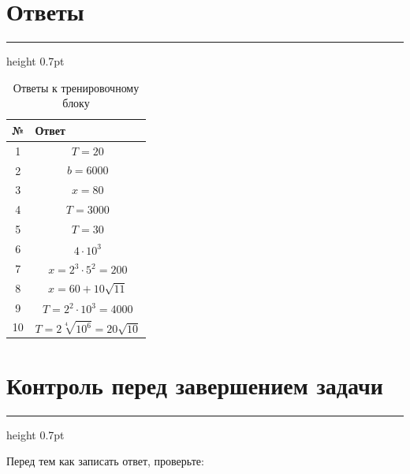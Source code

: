 \documentclass[a4paper,12pt]{article}
\newcommand{\sectionline}{%
    \par\vspace{0.15em}
    {\color{lightaccent}\hrule height 0.7pt}
    \vspace{0.7em}
}
\begin{document}

\newpage
\thispagestyle{fancy}

\section*{\textcolor{darkaccent}{Ответы}}

\sectionline

\renewcommand{\arraystretch}{1.4}

\begin{table}[ht]
\centering
\caption{Ответы к тренировочному блоку}
\begin{tabularx}{\linewidth}{@{}cX@{}}
\toprule
\textbf{№} & \textbf{Ответ} \\
\midrule

1 &
\[
T=20
\]
\\

2 &
\[
b=6000
\]
\\

3 &
\[
x=80
\]
\\

4 &
\[
T=3000
\]
\\

5 &
\[
T=30
\]
\\

6 &
\[
4\cdot10^3
\]
\\

7 &
\[
x=2^3\cdot5^2=200
\]
\\

8 &
\[
x=60+10\sqrt{11}
\]
\\

9 &
\[
T=2^2\cdot10^3=4000
\]
\\

10 &
\[
T=2\sqrt[4]{10^6}
=20\sqrt{10}
\]
\\

\bottomrule
\end{tabularx}
\end{table}

\vspace{1cm}

\section*{\textcolor{darkaccent}{Контроль перед завершением задачи}}

\sectionline

Перед тем как записать ответ, проверьте:
\end{document}
